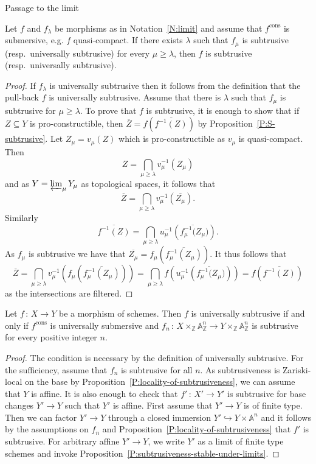 \documentclass[a4paper,twoside,11pt]{amsart}[2009/07/02] %
\newcommand{\pref}[1]{\eqref{#1}}
\newcommand{\Z}{\mathbb{Z}}
\newcommand{\inj}{\hookrightarrow}
\newcommand{\map}[3]{#1\,:\, #2\rightarrow #3}
\newcommand{\cons}{\mathrm{cons}} %
\newcommand{\A}[1]{\mathbb{A}^{#1}}    %
\begin{document}
\begin{section}{Passage to the limit}
\begin{proposition}
\label{P:subtrusiveness-stable-under-limits}
Let $f$ and $f_\lambda$ be morphisms as in Notation~\pref{N:limit} and assume
that $f^{\cons}$ is submersive, e.g. $f$ quasi-compact.
If there exists $\lambda$ such that $f_\mu$ is
subtrusive (resp.\ universally subtrusive) for every $\mu\geq\lambda$, then $f$
is subtrusive (resp.\ universally subtrusive).
\end{proposition}
\begin{proof}
If $f_\lambda$ is universally subtrusive then it follows from the definition
that the pull-back $f$ is universally subtrusive. Assume that there is
$\lambda$ such that $f_\mu$ is subtrusive for $\mu\geq\lambda$. To prove that
$f$ is subtrusive, it is enough to show that if $Z\subseteq Y$ is
pro-constructible, then $\overline{Z}=f(\overline{f^{-1}(Z)})$ by
Proposition~\pref{P:S-subtrusive}. Let $Z_\mu=v_\mu(Z)$ which is
pro-constructible as $v_\mu$ is quasi-compact. Then
%
$$Z=\bigcap_{\mu\geq\lambda} v^{-1}_\mu(Z_\mu)$$
%
and as $Y=\varprojlim_\mu Y_\mu$ as topological spaces, it follows that
%
$$\overline{Z}=\bigcap_{\mu\geq\lambda} v^{-1}_\mu
\left(\overline{Z_\mu}\right).$$
%
Similarly
%
$$\overline{f^{-1}(Z)}=\bigcap_{\mu\geq\lambda} u^{-1}_\mu
\left(\overline{f_\mu^{-1}(Z_\mu})\right).$$
%
As $f_\mu$ is subtrusive we have that
$\overline{Z_\mu}=f_\mu(\overline{f^{-1}_\mu(Z_\mu)})$. It thus
follows that
%
$$\overline{Z}=\bigcap_{\mu\geq\lambda} v^{-1}_\mu
\left(f_\mu\left(\overline{f^{-1}_\mu(Z_\mu)}\right)\right)
=\bigcap_{\mu\geq\lambda} f\left(u^{-1}_\mu
\left(\overline{f_\mu^{-1}(Z_\mu})\right)\right)
=f\left(\overline{f^{-1}(Z)}\right)$$
%
as the intersections are filtered.
\end{proof}


\begin{corollary}\label{C:univ-submersive-An}
Let $\map{f}{X}{Y}$ be a morphism of schemes. Then $f$ is universally
subtrusive if and only if $f^{\cons}$ is universally submersive and
$\map{f_n}{X\times_{\Z} \A{n}_{\Z}}{Y\times_{\Z}
\A{n}_{\Z}}$ is subtrusive for every positive integer $n$.
\end{corollary}
\begin{proof}
The condition is necessary by the definition of universally subtrusive. For the
sufficiency, assume that $f_n$ is subtrusive for all $n$. As subtrusiveness is
Zariski-local on the base by Proposition~\pref{P:locality-of-subtrusiveness},
we can assume that $Y$ is affine. It is also enough to check that
$\map{f'}{X'}{Y'}$ is subtrusive for base changes $Y'\to Y$ such that $Y'$ is
affine. First assume that $Y'\to Y$ is of finite type. Then we can factor
$Y'\to Y$ through a closed immersion $Y'\inj Y\times \A{n}$ and it follows by
the assumptions on $f_n$ and Proposition~\pref{P:locality-of-subtrusiveness}
that $f'$ is subtrusive. For arbitrary affine $Y'\to Y$, we write $Y'$ as a
limit of finite type schemes and invoke
Proposition~\pref{P:subtrusiveness-stable-under-limits}.
\end{proof}


\end{section}
\end{document}
